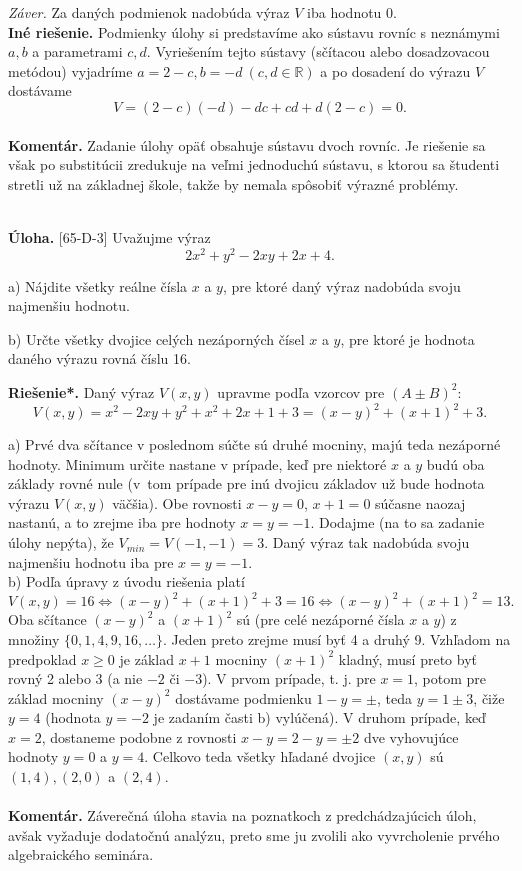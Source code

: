 \documentclass[11pt,a4paper,oneside,final]{book}
\newcommand{\RR}{\mathbb{R}}
\newcommand{\kom}{\textbf{Komentár.} }
\newcommand{\ul}{\textbf{Úloha.} }
\newcommand{\rieh}{\textbf{Riešenie*.} }
\begin{document}
\textit{Záver.} Za daných podmienok nadobúda výraz $V$ iba hodnotu 0.\\

\textbf{Iné riešenie.} Podmienky úlohy si predstavíme ako sústavu rovníc s neznámymi $a, b$ a parametrami $c, d$. Vyriešením tejto sústavy (sčítacou alebo dosadzovacou metódou) vyjadríme $a = 2 - c, b = -d \ (c, d \in \RR )$ a po dosadení do výrazu $V$ dostávame $$V = (2 - c)(-d) - dc + cd + d(2 - c) = 0.$$
\\
\kom Zadanie úlohy opäť obsahuje sústavu dvoch rovníc. Je riešenie sa však po substitúcii zredukuje na veľmi jednoduchú sústavu, s ktorou sa študenti stretli už na základnej škole, takže by nemala spôsobiť výrazné problémy. \\
\\
\begin{tcolorbox}[breakable,notitle,boxrule=0pt,colback=light-gray,colframe=light-gray]\ul [65-D-3] Uvažujme výraz $$2x^2+ y^2 - 2xy + 2x + 4.$$

a) Nájdite všetky reálne čísla $x$ a $y$, pre ktoré daný výraz nadobúda svoju najmenšiu hodnotu.

b) Určte všetky dvojice celých nezáporných čísel $x$ a $y$, pre ktoré je hodnota daného výrazu rovná číslu 16.

\end{tcolorbox}

\rieh Daný výraz $V (x, y)$ upravme podľa vzorcov pre $(A \pm B)^2$:$$
V(x, y) =  x^2 - 2xy + y^2 +  x^2+ 2x + 1 + 3 = (x - y)^2+ (x + 1)^2+ 3.$$

a) Prvé dva sčítance v poslednom súčte sú druhé mocniny, majú teda nezáporné hodnoty. Minimum určite nastane v prípade, keď pre niektoré $x$ a $y$ budú oba základy rovné nule (v~tom prípade pre inú dvojicu základov už bude hodnota výrazu $V (x, y)$ väčšia). Obe rovnosti $x - y = 0$, $x + 1 = 0$ súčasne naozaj nastanú, a to zrejme iba pre hodnoty $x = y = -1$. Dodajme (na to sa zadanie úlohy nepýta), že $V_{min} = V (-1, -1)= 3$. Daný výraz tak nadobúda svoju najmenšiu hodnotu iba pre $x = y = -1$.\\

b) Podľa úpravy z úvodu riešenia platí $$V (x, y) = 16 \Leftrightarrow (x -y)^2+ (x + 1)^2+ 3 = 16 \Leftrightarrow (x -y)^2+ (x + 1)^2= 13.$$
Oba sčítance $(x - y)^2$ a $(x + 1)^2$ sú (pre celé nezáporné čísla $x$ a $y$) z množiny $\{0, 1, 4, 9, 16, \ldots \}$. Jeden preto zrejme musí byť 4 a druhý 9. Vzhľadom na predpoklad $x \geq 0$ je základ $x+1$ mocniny $(x+1)^2$ kladný, musí preto byť rovný 2 alebo 3 (a nie $-2$ či $-3$). V prvom prípade, t. j. pre $x = 1$, potom pre základ mocniny $(x - y)^2$ dostávame podmienku $1 - y = \pm $, teda $y = 1 \pm 3$, čiže $y = 4$ (hodnota $y = -2$ je zadaním časti b) vylúčená). V druhom prípade, keď $x = 2$, dostaneme podobne z rovnosti $x - y = 2 - y = \pm 2$ dve vyhovujúce hodnoty $y = 0$ a $y = 4$. Celkovo teda všetky hľadané dvojice $(x, y)$ sú $(1, 4), (2, 0)$ a $(2, 4)$.\\
\\
\kom Záverečná úloha stavia na poznatkoch z predchádzajúcich úloh, avšak vyžaduje dodatočnú analýzu, preto sme ju zvolili ako vyvrcholenie prvého algebraického seminára.
\end{document}
